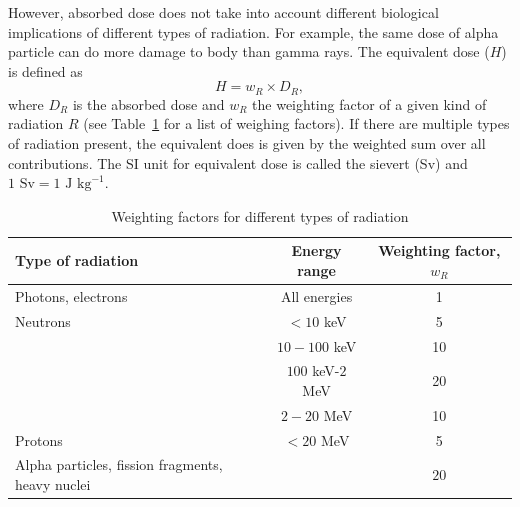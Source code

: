 \documentclass[nofootinbib,preprint,aps]{revtex4-1}
\begin{document}
        However, absorbed dose does not take into account different biological implications of different types
        of radiation.
        For example, the same dose of alpha particle can do more damage to body than gamma rays. The equivalent
        dose ($H$) is defined as
        \begin{equation}
        H=w_R \times D_R,
        \end{equation}
        where $D_R$ is the absorbed dose and $w_R$ the weighting factor of a given kind of radiation $R$
        (see Table~\ref{tab:eq} for a list of weighing factors). If there are multiple types of radiation 
        present, the equivalent does is given by the weighted sum over all contributions. The SI unit for
        equivalent dose is called the sievert (Sv) and $1\text{ Sv}=1\text{ J kg}^{-1}$.
        \begin{table}
            \centering
            \caption{Weighting factors for different types of radiation\cite{icrp74}}
            \begin{ruledtabular}
                \begin{tabular}{l c c}
                Type of radiation & Energy range & Weighting factor, $w_R$\\
                \hline
                Photons, electrons & All energies & 1\\
                Neutrons & $<10$ keV & 5 \\
                         & $10-100$ keV & 10 \\
                         & $100$ keV-$2$ MeV & 20 \\
                         & $2-20$ MeV & 10 \\
                Protons & $<20$ MeV & 5 \\
                Alpha particles, fission fragments, heavy nuclei & & $20$\\
            \end{tabular}
            \label{tab:eq}
            \end{ruledtabular}
        \end{table}
\end{document}
